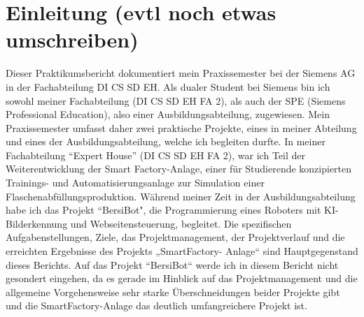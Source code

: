 \chapter{Einleitung (evtl noch etwas umschreiben)}\label{ch:data}

\label{sec:Einleitung}

Dieser Praktikumsbericht dokumentiert mein Praxissemester bei der Siemens AG in der Fachabteilung DI CS SD EH.
Als dualer Student bei Siemens bin ich sowohl meiner Fachabteilung (DI CS SD EH FA 2), als auch der SPE  (Siemens Professional Education), also einer Ausbildungsabteilung, zugewiesen.
Mein Praxissemester umfasst daher zwei praktische Projekte, eines in meiner Abteilung und eines der Ausbildungsabteilung, welche ich begleiten durfte. In meiner Fachabteilung “Expert House” (DI CS SD EH FA 2), war ich Teil der Weiterentwicklung der Smart Factory-Anlage, einer für Studierende konzipierten Trainings- und Automatisierungsanlage zur Simulation einer Flaschenabfüllungsproduktion. Während meiner Zeit in der Ausbildungsabteilung habe ich das Projekt “BersiBot", die Programmierung eines Roboters mit KI-Bilderkennung und Webseitensteuerung, begleitet.
Die spezifischen Aufgabenstellungen, Ziele, das Projektmanagement,
der Projektverlauf und die erreichten Ergebnisse des Projekts „SmartFactory-
Anlage“ sind Hauptgegenstand dieses Berichts. Auf das Projekt “BersiBot“ werde
ich in diesem Bericht nicht gesondert eingehen, da es gerade im Hinblick auf das
Projektmanagement und die allgemeine Vorgehensweise sehr starke
Überschneidungen beider Projekte gibt und die SmartFactory-Anlage das deutlich
umfangreichere Projekt ist.

